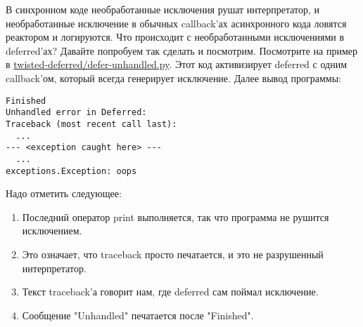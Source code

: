 В синхронном коде необработанные исключения рушат 
интерпретатор, и необработанные исключение в обычных callback'ах 
асинхронного кода ловятся реактором и логируются. Что 
происходит с необработанными исключениями в deferred'ах? 
Давайте попробуем так сделать и посмотрим. Посмотрите на 
пример в 
\href{http://github.com/jdavisp3/twisted-intro/blob/master/twisted-deferred/defer-unhandled.py#L1}{twisted-deferred/defer-unhandled.py}. 
Этот код активизирует deferred с одним callback'ом, который 
всегда генерирует исключение. Далее вывод программы:


 \begin{verbatim}
Finished
Unhandled error in Deferred:
Traceback (most recent call last):
  ...
--- <exception caught here> ---
  ...
exceptions.Exception: oops
\end{verbatim} 



Надо отметить следующее:

\begin{enumerate}

\item Последний оператор print выполняется, так что программа не 
рушится исключением.

\item Это означает, что traceback просто печатается, и это не разрушенный интерпретатор.

\item Текст traceback'а говорит нам, где deferred сам поймал исключение.

\item Сообщение "Unhandled" печатается после "Finished".

\end{enumerate}


